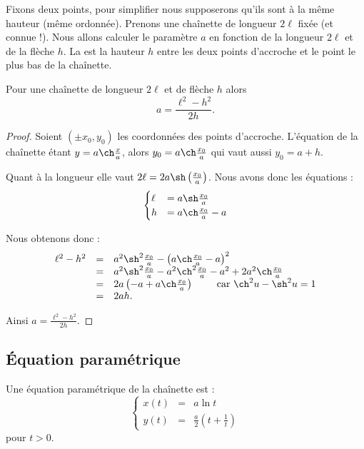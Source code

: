 \documentclass[class=report,crop=false]{standalone}
\begin{document}
Fixons deux points, pour simplifier nous supposerons qu'ils sont à la même 
hauteur (même ordonnée). Prenons une chaînette de longueur $2\ell$ fixée (et connue !).
Nous allons calculer le paramètre $a$ en fonction de la longueur $2\ell$
et de la flèche $h$. La  est la hauteur $h$ entre les deux points d'accroche
et le point le plus bas de la chaînette.
\shorthandoff{:}
\shorthandon{:}


\begin{proposition}
\label{prop:param}
Pour une chaînette de longueur $2\ell$ et de flèche $h$ alors
$$a=\frac{\ell^2-h^2}{2h}.$$
\end{proposition}

\begin{proof}
Soient $(\pm x_0, y_0)$ les coordonnées des points d'accroche.
L'équation de la chaînette étant $y= a \ch \frac x a$,
alors $y_0 = a \ch \frac{x_0}{a}$ qui vaut aussi $y_0 = a + h$.

Quant à la longueur elle vaut $2\ell =  2a \sh \left( \frac{x_0}{a} \right)$.
Nous avons donc les équations :
$$\begin{cases}
\ell &= a \sh \frac{x_0}{a} \\
   h &= a \ch \frac{x_0}{a} - a \\ 
\end{cases}$$

Nous obtenons donc :
$$\begin{array}{rcl}
\ell^2 - h^2 
  &=& a^2 \sh^2 \tfrac{x_0}{a} - \left( a \ch \tfrac{x_0}{a} - a \right)^2 \\
  &=& a^2 \sh^2 \tfrac{x_0}{a} - a^2 \ch^2  \tfrac{x_0}{a} -a^2 +2 a^2 \ch \tfrac{x_0}{a} \\
  &=& 2a\left(-a+a \ch \tfrac{x_0}{a} \right) \qquad \text{ car } \ch^2 u - \sh^2 u = 1 \\
  &=& 2ah. \\
\end{array}$$

Ainsi $\displaystyle a = \frac{\ell^2-h^2}{2h}$.
\end{proof}


\subsection{\'Equation paramétrique}

\begin{proposition}
Une équation paramétrique de la chaînette est :
$$\left\{
\begin{array}{rcl}
x(t) &=& a \ln t \\
y(t) &=& \frac a 2 \left(t+\frac 1 t\right)
\end{array}
\right.
$$
pour $t>0$.
\end{proposition}
\end{document}
